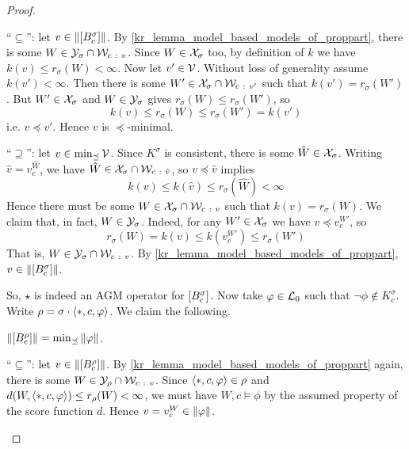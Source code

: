 \begin{proof}
\begin{claimproof}
            ``$\subseteq$'': let $v \in \|{\left[{B^\sigma_c}\right]}\|$. By
            \cref{kr_lemma_model_based_models_of_proppart}, there is some $W \in
            \Y_\sigma \cap \W_{c\ :\  v}$. Since $W \in \mathcal{X}_\sigma$ too, by
            definition of $k$ we have $k(v) \le r_\sigma(W) < \infty$. Now let
            $v' \in \mathcal{V}$. Without loss of generality assume $k(v') < \infty$.
            Then there is some $W' \in \mathcal{X}_\sigma \cap \mathcal{W}_{c\ :\  v'}$ such that
            $k(v') = r_\sigma(W')$. But $W' \in \mathcal{X}_\sigma$ and $W \in
            \mathcal{Y}_\sigma$ gives $r_\sigma(W) \le r_\sigma(W')$, so
            \[
                k(v) \le r_\sigma(W) \le r_\sigma(W') = k(v')
            \]
            i.e. $v \preceq v'$. Hence $v$ is $\preceq$-minimal.

            ``$\supseteq$'': let $v \in \min_{\preceq}\mathcal{V}$. Since $K^\sigma$
            is consistent, there is some $\hat{W} \in \mathcal{X}_\sigma$.  Writing
            $\hat{v} = v^{\hat{W}}_c$, we have $\hat{W} \in \mathcal{X}_\sigma \cap
            \mathcal{W}_{c\ :\ \hat{v}}$, so $v \preceq \hat{v}$ implies
            \[
                k(v)
                \le k(\hat{v})
                \le r_\sigma(\hat{W})
                < \infty
            \]
            Hence there must be some $W \in \X_\sigma \cap \W_{c\ :\ v}$ such
            that $k(v) = r_\sigma(W)$. We claim that, in fact, $W \in
            \mathcal{Y}_\sigma$. Indeed, for any $W' \in \mathcal{X}_\sigma$ we have $v \preceq
            v^{W'}_c$, so
            \[
                r_\sigma(W)
                = k(v)
                \le k(v^{W'}_c)
                \le r_\sigma(W')
            \]
            That is, $W \in \Y_\sigma \cap \W_{c\ :\  v}$. By
            \cref{kr_lemma_model_based_models_of_proppart}, $v \in
            \|{\left[{B^\sigma_c}\right]}\|$.
        \end{claimproof}

    So, $\star$ is indeed an AGM operator for $\left[{B^\sigma_c}\right]$. Now take
    $\varphi \in \mathcal{L}{}_0$ such that $\neg\phi \notin K^\sigma_c$. Write $\rho =
    \sigma \cdot \langle {\ast, c, \varphi} \rangle$. We claim the following.

        \begin{claim}
            \label{kr_claim_propmods_rho_min_models_of_phi}
            $\|{\left[{B^\rho_c}\right]}\| =
            \min\nolimits_{\preceq}{\|{\varphi}\|}$.
        \end{claim}
        \begin{claimproof}
            ``$\subseteq$'': let $v \in \|{\left[{B^\rho_c}\right]}\|$.  By
            \cref{kr_lemma_model_based_models_of_proppart} again, there is some $W
            \in \mathcal{Y}_\rho \cap \mathcal{W}_{c\ :\  v}$. Since $\langle {\ast, c, \varphi} \rangle \in
            \rho$ and $d(W, \langle {\ast, c, \varphi} \rangle) \le r_\rho(W) < \infty$, we
            must have $W, c \models \phi$ by the assumed property of the score
            function $d$. Hence $v = v^W_c \in \|{\varphi}\|$.


\end{claimproof}
\end{proof}
